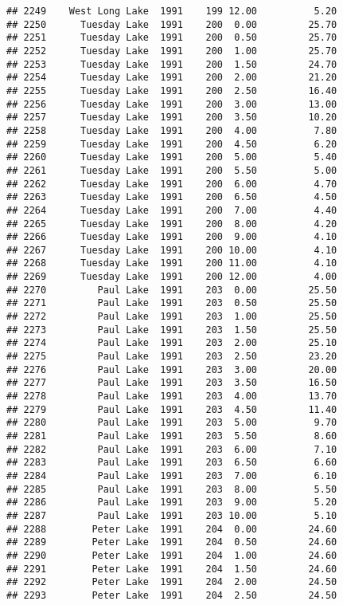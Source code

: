 \documentclass[
]{article}
\begin{document}
\begin{verbatim}
## 2249    West Long Lake  1991    199 12.00          5.20
## 2250      Tuesday Lake  1991    200  0.00         25.70
## 2251      Tuesday Lake  1991    200  0.50         25.70
## 2252      Tuesday Lake  1991    200  1.00         25.70
## 2253      Tuesday Lake  1991    200  1.50         24.70
## 2254      Tuesday Lake  1991    200  2.00         21.20
## 2255      Tuesday Lake  1991    200  2.50         16.40
## 2256      Tuesday Lake  1991    200  3.00         13.00
## 2257      Tuesday Lake  1991    200  3.50         10.20
## 2258      Tuesday Lake  1991    200  4.00          7.80
## 2259      Tuesday Lake  1991    200  4.50          6.20
## 2260      Tuesday Lake  1991    200  5.00          5.40
## 2261      Tuesday Lake  1991    200  5.50          5.00
## 2262      Tuesday Lake  1991    200  6.00          4.70
## 2263      Tuesday Lake  1991    200  6.50          4.50
## 2264      Tuesday Lake  1991    200  7.00          4.40
## 2265      Tuesday Lake  1991    200  8.00          4.20
## 2266      Tuesday Lake  1991    200  9.00          4.10
## 2267      Tuesday Lake  1991    200 10.00          4.10
## 2268      Tuesday Lake  1991    200 11.00          4.10
## 2269      Tuesday Lake  1991    200 12.00          4.00
## 2270         Paul Lake  1991    203  0.00         25.50
## 2271         Paul Lake  1991    203  0.50         25.50
## 2272         Paul Lake  1991    203  1.00         25.50
## 2273         Paul Lake  1991    203  1.50         25.50
## 2274         Paul Lake  1991    203  2.00         25.10
## 2275         Paul Lake  1991    203  2.50         23.20
## 2276         Paul Lake  1991    203  3.00         20.00
## 2277         Paul Lake  1991    203  3.50         16.50
## 2278         Paul Lake  1991    203  4.00         13.70
## 2279         Paul Lake  1991    203  4.50         11.40
## 2280         Paul Lake  1991    203  5.00          9.70
## 2281         Paul Lake  1991    203  5.50          8.60
## 2282         Paul Lake  1991    203  6.00          7.10
## 2283         Paul Lake  1991    203  6.50          6.60
## 2284         Paul Lake  1991    203  7.00          6.10
## 2285         Paul Lake  1991    203  8.00          5.50
## 2286         Paul Lake  1991    203  9.00          5.20
## 2287         Paul Lake  1991    203 10.00          5.10
## 2288        Peter Lake  1991    204  0.00         24.60
## 2289        Peter Lake  1991    204  0.50         24.60
## 2290        Peter Lake  1991    204  1.00         24.60
## 2291        Peter Lake  1991    204  1.50         24.60
## 2292        Peter Lake  1991    204  2.00         24.50
## 2293        Peter Lake  1991    204  2.50         24.50

\end{verbatim}
\end{document}
